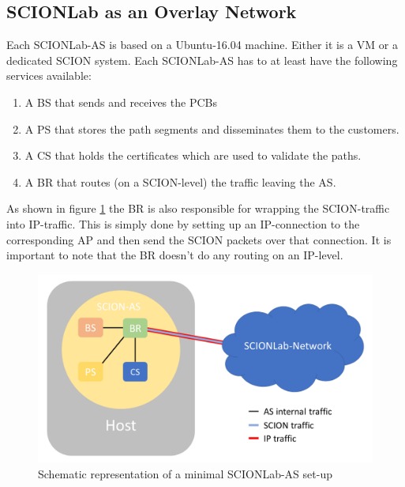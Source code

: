 \subsection{SCIONLab as an Overlay Network}
Each \acs{SCIONLab}-\acs{AS} is based on a Ubuntu-16.04 machine. Either it is a \acl{VM} or a dedicated \acs{SCION} system. Each \acs{SCIONLab}-\acs{AS} has to at least have the following services available: 
\\
\begin{enumerate}
\item A \acl{BS} that sends and receives the \acsp{PCB}
\item A \acl{PS} that stores the path segments and disseminates them to the customers.
\item A \acl{CS} that holds the certificates which are used to validate the paths.
\item A \acl{BR} that routes (on a \acs{SCION}-level) the traffic leaving the \acs{AS}.
\end{enumerate}

As shown in figure \ref{SCIONLab-AS} the \acl{BR} is also responsible for wrapping the \acs{SCION}-traffic into \acs{IP}-traffic. This is simply done by setting up an \acs{IP}-connection to the corresponding \acl{AP} and then send the \acs{SCION} packets over that connection. It is important to note that the \acl{BR} doesn't do any routing on an \acs{IP}-level.

\begin{figure}[h]
	\centering
	\includegraphics[width=\textwidth]{img/SCIONLab-AS.png}
	\caption{Schematic representation of a minimal SCIONLab-AS set-up}
	\label{SCIONLab-AS}
\end{figure}

